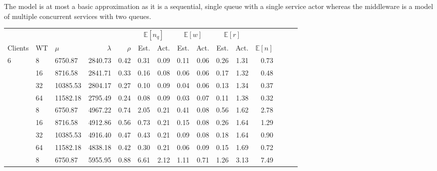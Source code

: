         The model is at most a basic approximation as it is a sequential, single queue with a single service actor
        whereas the middleware is a model of multiple concurrent services with two queues.

        \begin{table}
            \footnotesize{
                \begin{tabular}{lllrrrrrrrrrrrr}
                    \toprule
                    & & & & & \multicolumn{2}{c}{$\mathbb{E}[n_q]$} & \multicolumn{2}{c}{$\mathbb{E}[w]$} & \multicolumn{2}{c}{$\mathbb{E}[r]$} & \\
                    \cmidrule(lr){6-7}
                    \cmidrule(lr){8-9}
                    \cmidrule(lr){10-11}
                    Clients  & WT & $\mu$    & $\lambda$ & $\rho$ & Est.   & Act.   & Est.  & Act.  & Est.  & Act.  & $\mathbb{E}[n]$ \\
                    \midrule
                    6        & 8  & 6750.87  & 2840.73   & 0.42   & 0.31   & 0.09   & 0.11  & 0.06  & 0.26  & 1.31  & 0.73            \\
                             & 16 & 8716.58  & 2841.71   & 0.33   & 0.16   & 0.08   & 0.06  & 0.06  & 0.17  & 1.32  & 0.48            \\
                             & 32 & 10385.53 & 2804.17   & 0.27   & 0.10   & 0.09   & 0.04  & 0.06  & 0.13  & 1.34  & 0.37            \\
                             & 64 & 11582.18 & 2795.49   & 0.24   & 0.08   & 0.09   & 0.03  & 0.07  & 0.11  & 1.38  & 0.32            \\
                    \addlinespace
                    12       & 8  & 6750.87  & 4967.22   & 0.74   & 2.05   & 0.21   & 0.41  & 0.08  & 0.56  & 1.62  & 2.78            \\
                             & 16 & 8716.58  & 4912.86   & 0.56   & 0.73   & 0.21   & 0.15  & 0.08  & 0.26  & 1.64  & 1.29            \\
                             & 32 & 10385.53 & 4916.40   & 0.47   & 0.43   & 0.21   & 0.09  & 0.08  & 0.18  & 1.64  & 0.90            \\
                             & 64 & 11582.18 & 4838.18   & 0.42   & 0.30   & 0.21   & 0.06  & 0.09  & 0.15  & 1.69  & 0.72            \\
                    \addlinespace
                    24       & 8  & 6750.87  & 5955.95   & 0.88   & 6.61   & 2.12   & 1.11  & 0.71  & 1.26  & 3.13  & 7.49            \\

\end{tabular}}
\end{table}
